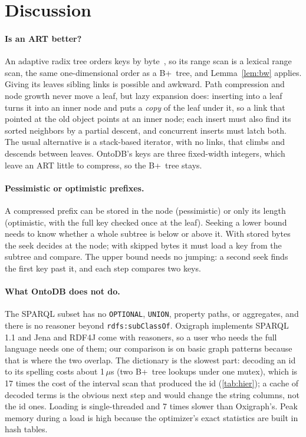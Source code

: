 \documentclass[sigconf, nonacm]{acmart}
\newcommand{\sys}{OntoDB}
\begin{document}
\section{Discussion}
\label{sec:discussion}

\paragraph{Is an ART better?} An adaptive radix tree orders keys by byte~\cite{leis2013}, so its range scan is a lexical range scan, the same one-dimensional order as a B+~tree, and Lemma~\ref{lem:bw} applies. Giving its leaves sibling links is possible and awkward. Path compression and node growth never move a leaf, but lazy expansion does: inserting into a leaf turns it into an inner node and puts a \emph{copy} of the leaf under it, so a link that pointed at the old object points at an inner node; each insert must also find its sorted neighbors by a partial descent, and concurrent inserts must latch both. The usual alternative is a stack-based iterator, with no links, that climbs and descends between leaves. \sys{}'s keys are three fixed-width integers, which leave an ART little to compress, so the B+~tree stays.

\paragraph{Pessimistic or optimistic prefixes.} A compressed prefix can be stored in the node (pessimistic) or only its length (optimistic, with the full key checked once at the leaf). Seeking a lower bound needs to know whether a whole subtree is below or above it. With stored bytes the seek decides at the node; with skipped bytes it must load a key from the subtree and compare. The upper bound needs no jumping: a second seek finds the first key past it, and each step compares two keys.

\paragraph{What \sys{} does not do.} The SPARQL subset has no \texttt{OPTIONAL}, \texttt{UNION}, property paths, or aggregates, and there is no reasoner beyond \texttt{rdfs:subClassOf}. Oxigraph implements SPARQL 1.1 and Jena and RDF4J come with reasoners, so a user who needs the full language needs one of them; our comparison is on basic graph patterns because that is where the two overlap. The dictionary is the slowest part: decoding an id to its spelling costs about 1\,$\mu$s (two B+~tree lookups under one mutex), which is 17 times the cost of the interval scan that produced the id (\autoref{tab:hier}); a cache of decoded terms is the obvious next step and would change the string columns, not the id ones. Loading is single-threaded and 7 times slower than Oxigraph's. Peak memory during a load is high because the optimizer's exact statistics are built in hash tables.
\end{document}
